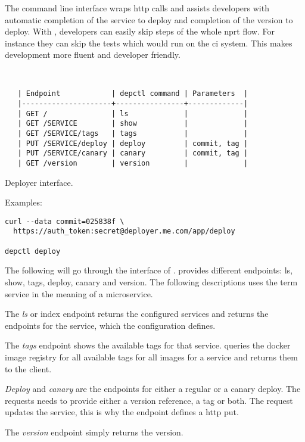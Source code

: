 The \depctl command line interface wraps http calls and assists developers with automatic
completion of the service to deploy and completion of the version to deploy. With \depctl,
developers can easily skip steps of the whole \gls{nprt} flow. For instance they can skip
the tests which would run on the \gls{ci} system. This makes development more fluent and
developer friendly.

\begin{table}[!htbp]
\begin{verbatim}


   | Endpoint            | depctl command | Parameters  |
   |---------------------+----------------+-------------|
   | GET /               | ls             |             |
   | GET /SERVICE        | show           |             |
   | GET /SERVICE/tags   | tags           |             |
   | PUT /SERVICE/deploy | deploy         | commit, tag |
   | PUT /SERVICE/canary | canary         | commit, tag |
   | GET /version        | version        |             |

\end{verbatim}
\caption{Deployer interface.}
\label{tab:interface}
\end{table}
Examples:
\begin{verbatim}
curl --data commit=025838f \
  https://auth_token:secret@deployer.me.com/app/deploy

depctl deploy
\end{verbatim}

The following will go through the interface of \deployer. \deployer provides different
endpoints: ls, show, tags, deploy, canary and version. The following descriptions uses the
term service in the meaning of a microservice.

The \emph{ls} or index endpoint returns the configured services and returns the endpoints
for the service, which the configuration defines.

The \emph{tags} endpoint shows the available tags for that service. \deployer queries the
docker image registry for all available tags for all images for a service and returns them
to the client.

\emph{Deploy} and \emph{canary} are the endpoints for either a regular or a canary
deploy. The requests needs to provide either a version reference, a tag or both. The
request updates the service, this is why the endpoint defines a http put.

The \emph{version} endpoint simply returns the \deployer version.

